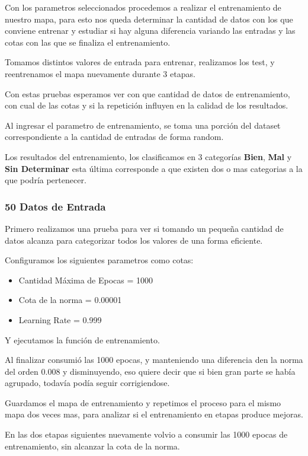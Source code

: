 Con los parametros seleccionados procedemos a realizar el entrenamiento de
nuestro mapa, para esto nos queda determinar la cantidad de datos con los que
conviene entrenar y estudiar si hay alguna diferencia variando las entradas
y las cotas con las que se finaliza el entrenamiento.

Tomamos distintos valores de entrada para entrenar, realizamos los test, y
reentrenamos el mapa nuevamente durante 3 etapas.

Con estas pruebas esperamos ver con que cantidad de datos de entrenamiento, 
con cual de las cotas y si la repetición influyen en la calidad de los resultados.

Al ingresar el parametro de entrenamiento, se toma una porción del dataset correspondiente
a la cantidad de entradas de forma random.

Los resultados del entrenamiento, los clasificamos en 3 categorías \textbf{Bien}, \textbf{Mal}
y \textbf{Sin Determinar} esta última corresponde a que existen dos o mas categorias a la que
podría pertenecer.



\subsubsection{50 Datos de Entrada}

Primero realizamos una prueba para ver si tomando un pequeña cantidad de datos alcanza para
categorizar todos los valores de una forma eficiente.

Configuramos los siguientes parametros como cotas:

\begin{itemize}
	\item Cantidad Máxima de Epocas = 1000
	\item Cota de la norma = 0.00001
	\item Learning Rate = 0.999
\end{itemize}


Y ejecutamos la función de entrenamiento.

Al finalizar consumió las 1000 epocas, y manteniendo una diferencia den la norma del orden 0.008 
y disminuyendo, eso quiere decir que si bien gran parte se había agrupado, todavía podía seguir
corrigiendose.

Guardamos el mapa de entrenamiento y repetimos el proceso para el mismo mapa dos veces mas,
para analizar si el entrenamiento en etapas produce mejoras.

En las dos etapas siguientes nuevamente volvio a consumir las 1000 epocas de entrenamiento,
sin alcanzar la cota de la norma.

